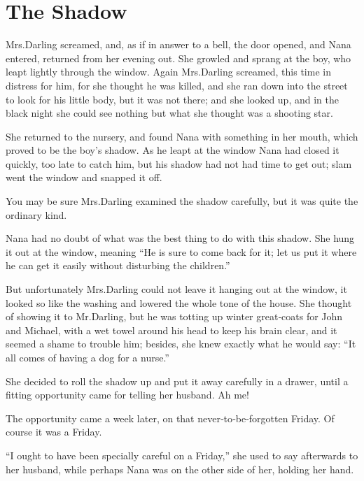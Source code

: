 
\chapter{The Shadow}

Mrs.\@ Darling screamed,
and, as if in answer to a bell, the door opened,
and Nana entered, returned from her evening out.
She growled and sprang at the boy, who leapt lightly through the window.
Again Mrs.\@ Darling screamed, this time in distress for him, for she thought he was killed,
and she ran down into the street to look for his little body, but it was not there;
and she looked up, and in the black night she could see nothing but what she thought was a shooting star.

She returned to the nursery,
and found Nana with something in her mouth, which proved to be the boy’s shadow.
As he leapt at the window Nana had closed it quickly, too late to catch him,
but his shadow had not had time to get out;
slam went the window and snapped it off.

You may be sure Mrs.\@ Darling examined the shadow carefully,
but it was quite the ordinary kind.

Nana had no doubt of what was the best thing to do with this shadow.
She hung it out at the window, meaning “He is sure to come back for it;
let us put it where he can get it easily without disturbing the children.”

But unfortunately Mrs.\@ Darling could not leave it hanging out at the window,
it looked so like the washing and lowered the whole tone of the house.
She thought of showing it to Mr.\@ Darling,
but he was totting up winter great‐coats for John and Michael,
with a wet towel around his head to keep his brain clear, and it seemed a shame to trouble him;
besides, she knew exactly what he would say:
“It all comes of having a dog for a nurse.”

She decided to roll the shadow up and put it away carefully in a drawer,
until a fitting opportunity came for telling her husband.
Ah me!

The opportunity came a week later, on that never‐to‐be‐forgotten Friday.
Of course it was a Friday.

“I ought to have been specially careful on a Friday,” she used to say afterwards to her husband,
while perhaps Nana was on the other side of her, holding her hand.

